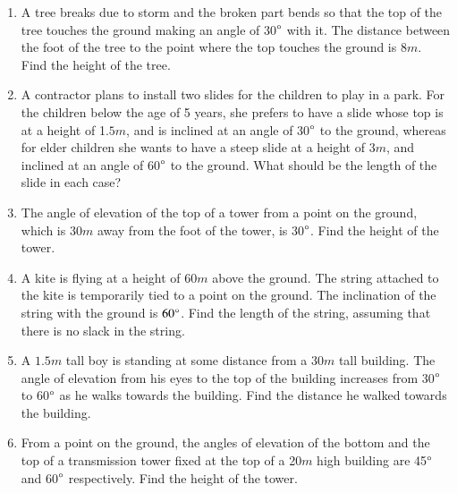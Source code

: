 \begin{enumerate}[label=\thesubsection.\arabic*.,ref=\thesubsection.\theenumi]
%
\item A tree breaks due to storm and the broken part bends so that the top of the tree touches the ground making an angle of 30$\degree$ with it.  The distance between the foot of the tree to the point where the top touches the ground is $8m$.  Find the height of the tree.
%
\item A contractor plans to install two slides for the children to play in a park.  For the children below the age of 5 years, she prefers to have a slide whose top is at a height of 1.$5m$, and is inclined at an angle of 30$\degree$  to the ground, whereas for elder children she wants to have a steep slide at a height of $3m$, and inclined at an angle of 60$\degree$ to the ground.  What should be the length of the slide in each case?
%
\item The angle of elevation of the top of a tower from a point on the ground, which is $30m$ away from the foot of the tower, is 30$\degree$.  Find the height of the tower.
%
\item A kite is flying at a height of $60m$ above the ground.  The string attached to the kite is temporarily tied to a point on the ground.  The inclination of the string with the ground is $60\degree$.  Find the length of the string, assuming that there is no slack in the string.
%
\item A $1.5m$ tall boy is standing at some distance from a $30m$ tall building.  The angle of elevation from his eyes to the top of the building increases from 30$\degree$
 to 60$\degree $ as he walks towards the building.  Find the distance he walked towards the building.

\item From a point on the ground, the angles of elevation of the bottom and the top of a transmission tower fixed at the top of a 20$m$ high building are 45$\degree$ and 60$\degree$ respectively. Find the height of the tower.


\end{enumerate}
